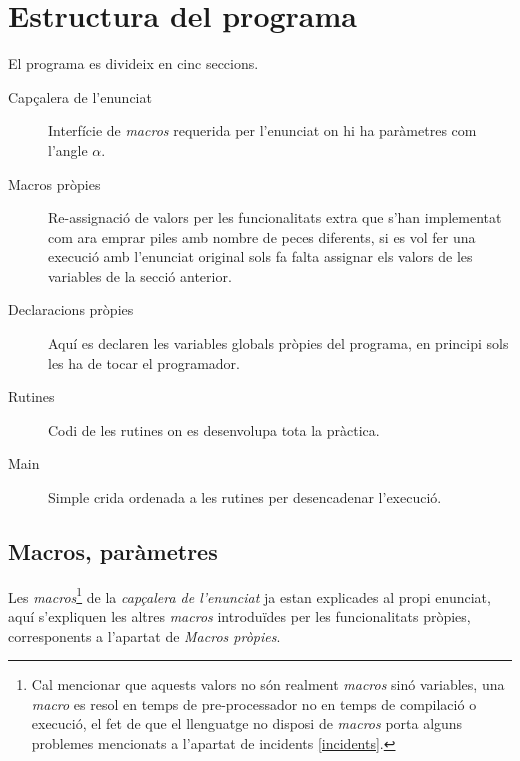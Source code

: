 \section{Estructura del programa}
El programa es divideix en cinc seccions.

\begin{description}
\item [Capçalera de l'enunciat] Interfície de \emph{macros} requerida
per l'enunciat on hi ha paràmetres com l'angle $\alpha$.

\item [Macros pròpies] Re-assignació de valors per les funcionalitats extra que
s'han implementat com ara emprar piles amb nombre de peces diferents, si es vol
fer una execució amb l'enunciat original sols fa falta assignar els valors de
les variables de la secció anterior.

\item [Declaracions pròpies] Aquí es declaren les variables globals pròpies
del programa, en principi sols les ha de tocar el programador.

\item [Rutines] Codi de les rutines on es desenvolupa tota la pràctica.

\item [Main] Simple crida ordenada a les rutines per desencadenar l'execució.
\end{description}

\subsection{Macros, paràmetres}
Les \emph{macros}\footnote{Cal mencionar que aquests valors no són realment
\emph{macros} sinó variables, una \emph{macro} es resol en temps de
pre-processador no en temps de compilació o execució, el fet de que el
llenguatge no disposi de \emph{macros} porta alguns problemes mencionats
a l'apartat de incidents \ref{incidents}.} de la \emph{capçalera de l'enunciat} 
ja estan explicades al propi enunciat, aquí s'expliquen les altres
\emph{macros} introduïdes per les funcionalitats pròpies, corresponents a
l'apartat de \emph{Macros pròpies}.

